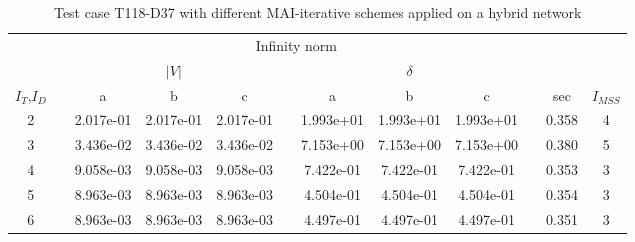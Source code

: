 \begin{table}
\renewcommand{\arraystretch}{1.3}
\centering
\label{tab:hybridMAIschemes}\hspace{2cm}\caption{Test case T118-D37 with different MAI-iterative schemes applied on a hybrid network}
\begin{adjustbox}{width=1\textwidth} %
\small
\begin{tabular}{cccccccccccc}
\toprule
{} && \multicolumn{7}{c}{Infinity norm} && &  \\
\cmidrule{3-9}
{} && \multicolumn{3}{c}{$|V|$} && \multicolumn{3}{c}{$\delta$} && \\
\cmidrule{3-5}\cmidrule{7-9}
{$I_T$,$I_D$} &&        a &        b &       c &&        a &       b &        c && sec & $I_{MSS}$\\
\midrule
2 &&  2.017e-01 &  2.017e-01 &  2.017e-01 &&  1.993e+01 &  1.993e+01 &  1.993e+01 && 0.358 & 4 \\
3 &&  3.436e-02 &  3.436e-02 &  3.436e-02 &&  7.153e+00 &  7.153e+00 &  7.153e+00 && 0.380& 5\\
4 &&  9.058e-03 &  9.058e-03 &  9.058e-03 &&  7.422e-01 &  7.422e-01 &  7.422e-01 && 0.353& 3\\
5 &&  8.963e-03 &  8.963e-03 &  8.963e-03 &&  4.504e-01 &  4.504e-01 &  4.504e-01 && 0.354& 3 \\
6 &&  8.963e-03 &  8.963e-03 &  8.963e-03 &&  4.497e-01 &  4.497e-01 &  4.497e-01 && 0.351&3\\
\bottomrule
\end{tabular}
\end{adjustbox}
\end{table}
